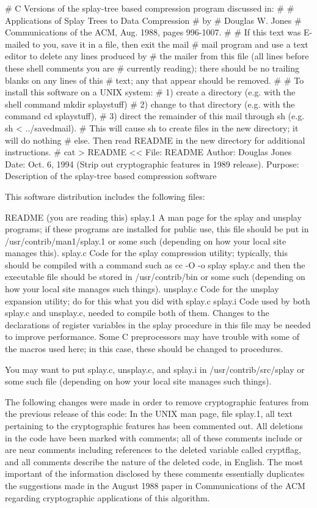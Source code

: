 #    C Versions of the splay-tree based compression program discussed in:
#
#		Applications of Splay Trees to Data Compression
#				     by
#			      Douglas W. Jones
#	     Communications of the ACM, Aug. 1988, pages 996-1007.
#
# If this text was E-mailed to you, save it in a file, then exit the mail
# mail program and use a text editor to delete any lines produced by
# the mailer from this file (all lines before these shell comments you are
# currently reading); there should be no trailing blanks on any lines of this
# text; any that appear should be removed.
#
# To install this software on a UNIX system:
#  1) create a directory (e.g. with the shell command mkdir splaystuff)
#  2) change to that directory (e.g. with the command cd splaystuff),
#  3) direct the remainder of this mail through sh (e.g. sh < ../savedmail).
# This will cause sh to create files in the new directory; it will do nothing
# else.  Then read README in the new directory for additional instructions.
#
cat > README <<\xxxxxxxxxx
  File: README
  Author: Douglas Jones
  Date: Oct. 6, 1994 (Strip out cryptographic features in 1989 release).
  Purpose: Description of the splay-tree based compression software

This software distribution includes the following files:

	README     (you are reading this)
	splay.1    A man page for the splay and unsplay programs; if these
			programs are installed for public use, this file
			should be put in /usr/contrib/man1/splay.1 or some
			such (depending on how your local site manages this).
	splay.c    Code for the splay compression utility; typically, this
			should be compiled with a command such as
			cc -O -o splay splay.c and then the executable
			file should be stored in /usr/contrib/bin or some such
			(depending on how your local site manages such things).
	unsplay.c  Code for the unsplay expansion utility;
			do for this what you did with splay.c
	splay.i    Code used by both splay.c and unsplay.c, needed to compile
			both of them.  Changes to the declarations of register
			variables in the splay procedure in this file may be
			needed to improve performance.  Some C preprocessors
			may have trouble with some of the macros used here; in
			this case, these should be changed to procedures.

You may want to put splay.c, unsplay.c, and splay.i in /usr/contrib/src/splay
or some such file (depending on how your local site manages such things).

The following changes were made in order to remove cryptographic features
from the previous release of this code:  In the UNIX man page, file splay.1,
all text pertaining to the cryptographic features has been commented out.
All deletions in the code have been marked with comments; all of these
comments include or are near comments including references to the deleted
variable called cryptflag, and all comments describe the nature of the
deleted code, in English.  The most important of the information disclosed
by these comments essentially duplicates the suggestions made in
the August 1988 paper in Communications of the ACM regarding cryptographic
applications of this algorithm.

